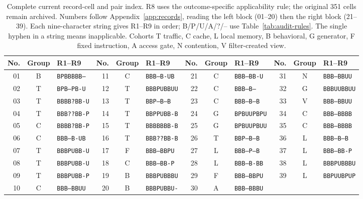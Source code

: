\begin{table}[t]\centering\footnotesize
\caption{Complete current record-cell and pair index. R8 uses the outcome-specific applicability rule; the original 351 cells remain archived. Numbers follow Appendix~\ref{app:records}, reading the left block (01--20) then the right block (21--39). Each nine-character string gives R1--R9 in order; B/P/U/A/?/-- use Table~\ref{tab:audit-rules}. The single hyphen in a string means inapplicable. Cohorts T traffic, C cache, L local memory, B behavioral, G generator, F fixed instruction, A access gate, N contention, V filter-created view.}\label{tab:r37-reconstruction}
\begin{tabular}{@{}rcl@{\hspace{12pt}}rcl@{\hspace{12pt}}rcl@{\hspace{12pt}}rcl@{}}\toprule
No. & Group & R1--R9 & No. & Group & R1--R9 & No. & Group & R1--R9 & No. & Group & R1--R9\\\midrule
01 & B & \texttt{BPBBBBB--} & 11 & C & \texttt{BBB--B-UB} & 21 & C & \texttt{BBB--BB-U} & 31 & N & \texttt{BBB--BBUU}\\
02 & T & \texttt{BPB--PB-U} & 12 & T & \texttt{BBBPUBBUU} & 22 & C & \texttt{BBB--B---} & 32 & G & \texttt{BBBUUBBUU}\\
03 & T & \texttt{BBBB?BB-U} & 13 & T & \texttt{BBP--B--B} & 23 & C & \texttt{BBB--B--B} & 33 & V & \texttt{BBB--BBUU}\\
04 & T & \texttt{BBB??BB-P} & 14 & T & \texttt{BBPPUBB-B} & 24 & G & \texttt{BPBUUPBPU} & 34 & C & \texttt{BBB--BBBB}\\
05 & C & \texttt{BBBB?BB-P} & 15 & T & \texttt{BBBBBBB-B} & 25 & G & \texttt{BPBUUPBUU} & 35 & C & \texttt{BBB--BBBB}\\
06 & C & \texttt{BBB--B-UB} & 16 & T & \texttt{BBB??BB-B} & 26 & T & \texttt{BBP--B--B} & 36 & L & \texttt{BBB--B--B}\\
07 & T & \texttt{BBBPUBB-U} & 17 & F & \texttt{BBB--BBPU} & 27 & L & \texttt{BBB--P--B} & 37 & L & \texttt{BBB--BB-P}\\
08 & T & \texttt{BBBPUBB-U} & 18 & C & \texttt{BBB--BB-P} & 28 & L & \texttt{BBB--B-BB} & 38 & L & \texttt{BBBPUBBBU}\\
09 & T & \texttt{BBBPUBB-P} & 19 & B & \texttt{BBBPUBBBU} & 29 & F & \texttt{BBB--BBPU} & 39 & L & \texttt{BBPUUBPUP}\\
10 & C & \texttt{BBB--BBUU} & 20 & B & \texttt{BBBPUBBU-} & 30 & A & \texttt{BBB--BBBU} &  & & \\

\end{tabular}
\end{table}
